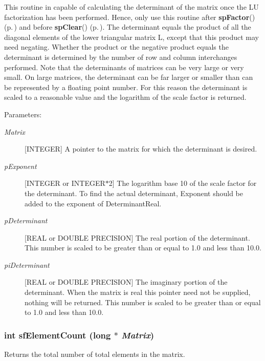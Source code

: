 This routine in capable of calculating the determinant of the matrix once the LU factorization has been performed. Hence, only use this routine after {\bf sp\-Factor}() {\rm (p.\,\pageref{spFactor_8c_a25})} and before {\bf sp\-Clear}() {\rm (p.\,\pageref{spBuild_8c_a10})}. The determinant equals the product of all the diagonal elements of the lower triangular matrix L, except that this product may need negating. Whether the product or the negative product equals the determinant is determined by the number of row and column interchanges performed. Note that the determinants of matrices can be very large or very small. On large matrices, the determinant can be far larger or smaller than can be represented by a floating point number. For this reason the determinant is scaled to a reasonable value and the logarithm of the scale factor is returned.\begin{Desc}
\item[Parameters: ]\par
\begin{description}
\item[{\em 
Matrix}][INTEGER] A pointer to the matrix for which the determinant is desired. \item[{\em 
p\-Exponent}][INTEGER or INTEGER$\ast$2] The logarithm base 10 of the scale factor for the determinant. To find the actual determinant, Exponent should be added to the exponent of Determinant\-Real. \item[{\em 
p\-Determinant}][REAL or DOUBLE PRECISION] The real portion of the determinant. This number is scaled to be greater than or equal to 1.0 and less than 10.0. \item[{\em 
pi\-Determinant}][REAL or DOUBLE PRECISION] The imaginary portion of the determinant. When the matrix is real this pointer need not be supplied, nothing will be returned. This number is scaled to be greater than or equal to 1.0 and less than 10.0. \end{description}
\end{Desc}
\subsubsection{\setlength{\rightskip}{0pt plus 5cm}int sf\-Element\-Count (long $\ast$ {\em Matrix})}\label{spFortran_8c_a82}


Returns the total number of total elements in the matrix.

